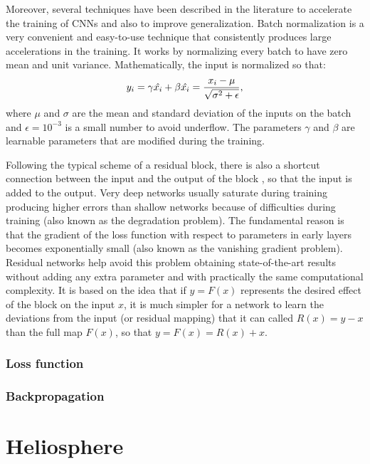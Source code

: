 Moreover, several techniques have been described in the literature to accelerate
the training of CNNs and also to improve generalization. Batch normalization \cite{batch_normalization15}
is a very convenient and easy-to-use technique that consistently produces large accelerations in the
training. It works by normalizing every batch to have 
zero mean and unit variance. Mathematically, the input is normalized so that:
\begin{equation}
y_i = \gamma \hat{x_i} + \beta \nonumber \\
\hat{x_i} = \frac{x_i - \mu}{\sqrt{\sigma^2 + \epsilon}},
\end{equation}
where $\mu$ and $\sigma$ are the mean and standard deviation of the inputs on the batch and
$\epsilon=10^{-3}$ is a small number to avoid underflow. The parameters $\gamma$ and $\beta$
are learnable parameters that are modified during the training.

Following the typical scheme of a residual block, there is also a shortcut connection 
between the input and the output of the block
\cite[see more information in][]{residualnetwork16,Asensio2017}, so that the input
is added to the output. Very deep networks usually
saturate during training producing higher errors than shallow networks because
of difficulties during training (also known as the degradation problem).
The fundamental reason is that the gradient of the loss function with
respect to parameters in early layers becomes exponentially small (also known as the vanishing gradient problem). Residual networks help avoid this problem obtaining state-of-the-art results without adding any extra parameter and with
practically the same computational complexity. It is based 
on the idea that if $y=F(x)$ represents the desired effect of the block on the
input $x$, it is much simpler for a network to learn the deviations from the input (or residual mapping) that it can called $R(x)=y-x$ than the full map $F(x)$, so that $y=F(x)=R(x)+x$.

\subsubsection{Loss function}
\subsubsection{Backpropagation}

\section{Heliosphere}

